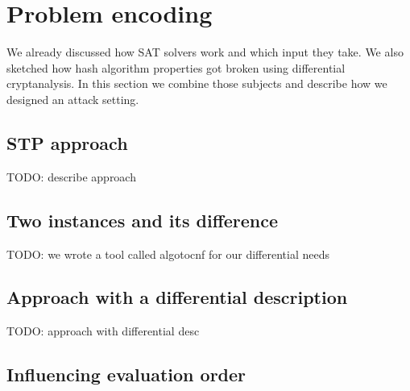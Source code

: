 \renewcommand*\chappic{img/encoding.pdf}
\renewcommand*\chapquote{There is concensus that encoding techniques usually have a dramatic impact on the efficiency of the SAT solver}
\renewcommand*\chapquotesrc{Magnus Bj\"ork}
\chapter{Problem encoding}
\label{ch:enc}

We already discussed how SAT solvers work and which input they take.
We also sketched how hash algorithm properties got broken using
differential cryptanalysis. In this section we combine those
subjects and describe how we designed an attack setting.

\section{STP approach}
\label{sec:enc-stp}


TODO: describe approach

\section{Two instances and its difference}
\label{sec:enc-algotocnf}

TODO: we wrote a tool called algotocnf for our differential needs

\section{Approach with a differential description}
\label{sec:enc-diff-desc}

TODO: approach with differential desc

\section{Influencing evaluation order}
\label{sec:enc-order}

